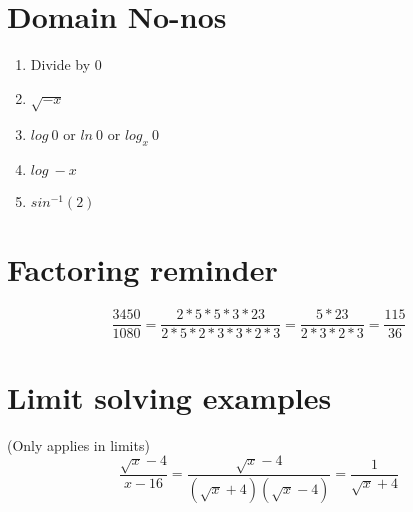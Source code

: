 \documentclass[12pt, english]{article}
\begin{document}
\section{Domain No-nos}
\begin{enumerate}
\item Divide by 0
\item $\sqrt{-x}$
\item $log\ 0$ or $ln\ 0$ or $log_x\ 0$
\item $log\ -x$
\item $sin^{-1}(2)$
\end{enumerate}

\section{Factoring reminder}
\begin{equation}
	\frac{3450}{1080} = \frac{2*5*5*3*23}{2*5*2*3*3*2*3} = \frac{5*23}{2*3*2*3} = \frac{115}{36}
\end{equation}

\section{Limit solving examples}
(Only applies in limits)
\begin{equation}
	\frac{\sqrt{x}-4}{x-16} = \frac{\sqrt{x}-4}{(\sqrt{x}+4)(\sqrt{x}-4)} = \frac{1}{\sqrt{x}+4}
\end{equation}
\end{document}
